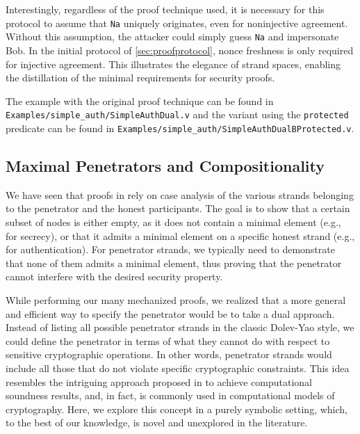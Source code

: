 Interestingly, regardless of the proof technique used, it is necessary for this protocol to assume that \lstinline|Na| uniquely originates, even
for
noninjective agreement.
Without this assumption, the attacker could simply guess \lstinline|Na| and impersonate Bob.
In the initial protocol of \cref{sec:proofprotocol}, nonce freshness is only required for injective agreement.
This illustrates the elegance of strand spaces, enabling the distillation of the minimal requirements for security proofs.

The example with the original proof technique can be found in \lstinline{Examples/simple_auth/SimpleAuthDual.v} and the variant using the \lstinline|protected| predicate can be found in \lstinline{Examples/simple_auth/SimpleAuthDualBProtected.v}.

\subsection{Maximal Penetrators and Compositionality}\label{sec:maximal}
We have seen that proofs in \easystrands{} rely on case analysis of the various strands belonging to the penetrator and the honest participants.
The goal is to show that a certain subset of nodes is either empty, as it does not contain a minimal element (e.g., for secrecy), or that it admits a minimal element on a specific honest strand (e.g., for authentication).
For penetrator strands, we typically need to demonstrate that none of them admits a minimal element, thus proving that the penetrator cannot interfere with the desired security property.

While performing our many mechanized proofs, we realized that a more general and efficient way to specify the penetrator would be to take a dual approach.
Instead of listing all possible penetrator strands in the classic Dolev-Yao style, we could define the penetrator in terms of what they cannot do with respect to sensitive cryptographic operations.
In other words, penetrator strands would include all those that do not violate specific cryptographic constraints.
This idea resembles the intriguing approach proposed in \cite{banaSymbolic} to achieve computational soundness results, and, in fact, is commonly used in computational models of cryptography.
Here, we explore this concept in a purely symbolic setting, which, to the best of our knowledge, is novel and unexplored in the literature.


